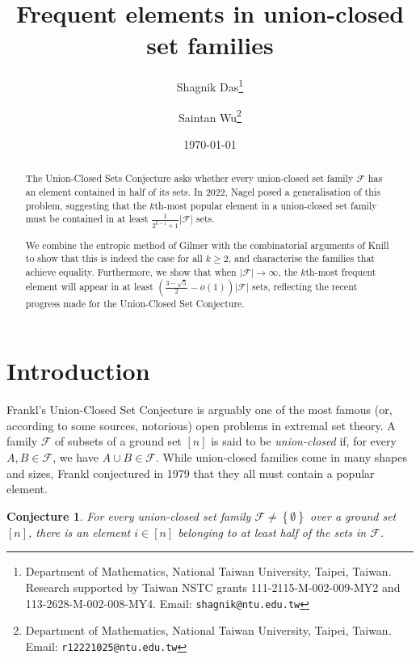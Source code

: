 \documentclass[a4paper,12pt]{article}
\theoremstyle{mystyle}	%
\newtheorem{conjecture}[theorem]{Conjecture}
\theoremstyle{definition}
\newcommand{\F}{\mathcal{F}}
\newcommand{\6}{\partial}
\begin{document}
\title{Frequent elements in union-closed set families}
\author{Shagnik Das\thanks{Department of Mathematics, National Taiwan University, Taipei, Taiwan.  Research supported by Taiwan NSTC grants 111-2115-M-002-009-MY2 and 113-2628-M-002-008-MY4. Email: \texttt{shagnik@ntu.edu.tw}} \and Saintan Wu\thanks{
Department of Mathematics, National Taiwan University, Taipei, Taiwan. Email: \texttt{r12221025@ntu.edu.tw}}}
\date{\today}
\maketitle

\begin{abstract}
    The Union-Closed Sets Conjecture asks whether every union-closed set family $\F$ has an element contained in half of its sets. In 2022, Nagel posed a generalisation of this problem, suggesting that the $k$th-most popular element in a union-closed set family must be contained in at least $\frac{1}{2^{k-1} + 1} |\F|$ sets.  
    
    We combine the entropic method of Gilmer with the combinatorial arguments of Knill to show that this is indeed the case for all $k \ge 2$, and characterise the families that achieve equality. Furthermore, we show that when $|\F| \to \infty$, the $k$th-most frequent element will appear in at least $\left( \frac{3 - \sqrt{5}}{2} - o(1) \right) |\F|$ sets, reflecting the recent progress made for the Union-Closed Set Conjecture.
\end{abstract}

\section{Introduction} \label{sec:intro}

Frankl's Union-Closed Set Conjecture is arguably one of the most famous (or, according to some sources, notorious) open problems in extremal set theory. A family $\mathcal{F}$ of subsets of a ground set $[n]$ is said to be \emph{union-closed} if, for every $A, B \in \mathcal{F}$, we have $A \cup B \in \mathcal{F}$. While union-closed families come in many shapes and sizes, Frankl conjectured in 1979 that they all must contain a popular element.

\begin{conjecture} \label{conj:UCSC}
    For every union-closed set family $\mathcal F \neq \left\{ \emptyset \right\}$ over a ground set $[n]$, there is an element $i \in [n]$ belonging to at least half of the sets in $\mathcal{F}$. 
\end{conjecture}
\end{document}
